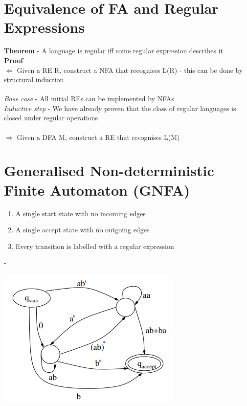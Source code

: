 \documentclass{article}[18pt]
\begin{document}
\section{Equivalence of FA and Regular Expressions}
\textbf{Theorem} - A language is regular iff some regular expression describes it\\
\textbf{Proof}\\
$\Leftarrow$ Given a RE R, construct a NFA that recognises L(R) - this can be done by structural induction\\
\\
\textit{Base case} - All initial REs can be implemented by NFAs\\
\textit{Inductive step} - We have already proven that the class of regular languages is closed under regular operations\\
\\
$\Rightarrow$ Given a DFA M, construct a RE that recognises L(M)

\section{Generalised Non-deterministic Finite Automaton (GNFA)}
\begin{enumerate}
	\item A single start state with no incoming edges
	\item A single accept state with no outgoing edges
	\item Every transition is labelled with a regular expression
\end{enumerate}
-\begin{center}
	\includegraphics[scale=0.7]{GNFA}
\end{center}
\end{document}
